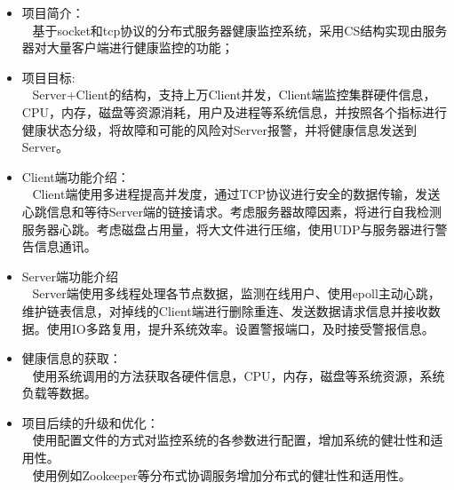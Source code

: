 \documentclass{resume}
\begin{document}
\begin{onehalfspacing}
	\begin{itemize}
		\item 项目简介：
		\\~ 基于socket和tcp协议的分布式服务器健康监控系统，采用CS结构实现由服务器对大量客户端进行健康监控的功能；
		\item 项目目标:
		\\~ Server+Client的结构，支持上万Client并发，Client端监控集群硬件信息，CPU，内存，磁盘等资源消耗，用户及进程等系统信息，并按照各个指标进行健康状态分级，将故障和可能的风险对Server报警，并将健康信息发送到Server。
		\item Client端功能介绍： 
		\\~ Client端使用多进程提高并发度，通过TCP协议进行安全的数据传输，发送心跳信息和等待Server端的链接请求。考虑服务器故障因素，将进行自我检测服务器心跳。考虑磁盘占用量，将大文件进行压缩，使用UDP与服务器进行警告信息通讯。
		\item Server端功能介绍
		\\~ Server端使用多线程处理各节点数据，监测在线用户、使用epoll主动心跳，维护链表信息，对掉线的Client端进行删除重连、发送数据请求信息并接收数据。使用IO多路复用，提升系统效率。设置警报端口，及时接受警报信息。
		\item 健康信息的获取：
		\\~ 使用系统调用的方法获取各硬件信息，CPU，内存，磁盘等系统资源，系统负载等数据。
		\item 项目后续的升级和优化：
		\\~ 使用配置文件的方式对监控系统的各参数进行配置，增加系统的健壮性和适用性。
		\\~ 使用例如Zookeeper等分布式协调服务增加分布式的健壮性和适用性。
	\end{itemize}
\end{onehalfspacing}
\end{document}
